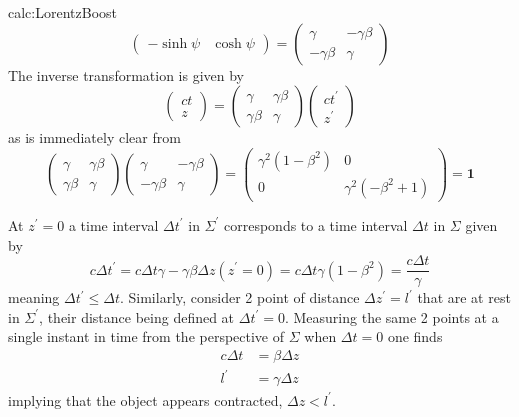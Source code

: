 \begin{calc}{calc:LorentzBoost}
\begin{equation}
\begin{pmatrix}
            -\sinh\psi & \cosh\psi
        \end{pmatrix}
        =
        \begin{pmatrix}
            \gamma       & -\gamma\beta \\
            -\gamma\beta & \gamma
        \end{pmatrix}
    \end{equation}
    The inverse transformation is given by
    \begin{equation}
        \begin{pmatrix}
            ct \\z
        \end{pmatrix}
        =
        \begin{pmatrix}
            \gamma      & \gamma\beta \\
            \gamma\beta & \gamma
        \end{pmatrix}
        \begin{pmatrix}
            ct^\prime \\z^\prime
        \end{pmatrix}
    \end{equation}
    as is immediately clear from
    \begin{equation*}
        \begin{pmatrix}
            \gamma      & \gamma\beta \\
            \gamma\beta & \gamma
        \end{pmatrix}
        \begin{pmatrix}
            \gamma       & -\gamma\beta \\
            -\gamma\beta & \gamma
        \end{pmatrix}
        =
        \begin{pmatrix}
            \gamma^2(1-\beta^2) & 0                    \\
            0                   & \gamma^2(-\beta^2+1)
        \end{pmatrix}
        =\mathbf{1}
    \end{equation*}

    At $z^\prime=0$ a time interval $\Delta t^\prime$ in $\Sigma^\prime$ corresponds to a time interval $\Delta t$ in $\Sigma$ given by
    \begin{equation}
        c\Delta t^\prime=c\Delta t\gamma-\gamma\beta \Delta z(z^\prime=0)=c\Delta t\gamma(1-\beta^2)=\frac{c\Delta t}{\gamma}
    \end{equation}
    meaning $\Delta t^\prime\leq\Delta t$. Similarly, consider 2 point of distance $\Delta z^\prime=l^\prime$ that are at rest in $\Sigma^\prime$, their distance being defined at $\Delta t^\prime=0$. Measuring the same 2 points at a single instant in time from the perspective of $\Sigma$ when $\Delta t=0$ one finds
    \begin{align*}
        c\Delta t & =\beta\Delta z  \\
        l^\prime  & =\gamma\Delta z
    \end{align*}
    implying that the object appears contracted, $\Delta z<l^\prime$.
\end{calc}

